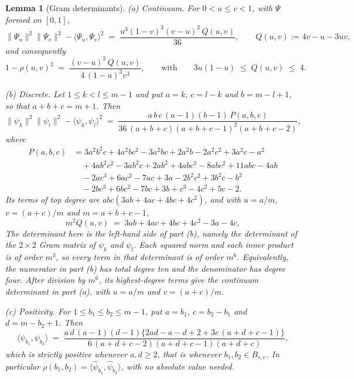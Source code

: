 \documentclass[10pt,a4paper]{amsart}
\newtheorem{lemma}{Lemma}
\begin{document}
\begin{lemma}[Gram determinants]
\label{lem:gramdet}
\emph{(a) Continuum.} For $0 < u \le v < 1$, with $\Psi$ formed on $[0,1]$,
\[
\|\Psi_u\|^2\|\Psi_v\|^2 - \langle \Psi_u,\Psi_v\rangle^2
\;=\; \frac{u^3 (1-v)^3 (v-u)^2 \, Q(u,v)}{36},
\qquad Q(u,v) := 4v - u - 3uv ,
\]
and consequently
\begin{equation}
\label{eq:rhoexact}
1 - \rho(u,v)^2 \;=\; \frac{(v-u)^2\,Q(u,v)}{4\,(1-u)^3 v^3},
\qquad\text{with}\qquad
3u(1-u) \;\le\; Q(u,v) \;\le\; 4 .
\end{equation}

\emph{(b) Discrete.} Let $1 \le k < l \le m-1$ and put $a = k$, $c = l-k$ and
$b = m-l+1$, so that $a+b+c = m+1$. Then
\[
\|\psi_k\|^2\|\psi_l\|^2 - \langle\psi_k,\psi_l\rangle^2
\;=\; \frac{a\,b\,c\,(a-1)(b-1)\,P(a,b,c)}
{36\,(a+b+c)(a+b+c-1)^2(a+b+c-2)} ,
\]
where
\begin{align*}
P(a,b,c) &= 3a^2b^2c + 4a^2bc^2 - 3a^2bc + 2a^2b - 2a^2c^2 + 3a^2c - a^2 \\
&\quad + 4ab^2c^2 - 3ab^2c + 2ab^2 + 4abc^3 - 8abc^2 + 11abc - 4ab \\
&\quad - 2ac^3 + 6ac^2 - 7ac + 3a - 2b^2c^2 + 3b^2c - b^2 \\
&\quad - 2bc^3 + 6bc^2 - 7bc + 3b + c^3 - 4c^2 + 5c - 2 .
\end{align*}
Its terms of top degree are $abc(3ab+4ac+4bc+4c^2)$, and with $u = a/m$, $v = (a+c)/m$ and $m = a+b+c-1$,
\[
m^2 Q(u,v) \;=\; 3ab + 4ac + 4bc + 4c^2 - 3a - 4c ,
\]
The determinant here is the left-hand side of part (b), namely the determinant
of the $2\times2$ Gram matrix of $\psi_k$ and $\psi_l$. Each squared norm and
each inner product is of order $m^3$, so every term in that determinant is of
order $m^6$. Equivalently, the numerator in part (b) has total degree ten and
the denominator has degree four. After division by $m^6$, its highest-degree
terms give the continuum determinant in part (a), with
$u=a/m$ and $v=(a+c)/m$.

\emph{(c) Positivity.} For $1 \le b_1 \le b_2 \le m-1$, put $a = b_1$, $c = b_2-b_1$ and $d = m-b_2+1$. Then
\[
\langle \psi_{b_1}, \psi_{b_2}\rangle \;=\;
\frac{a\,d\,(a-1)(d-1)\big\{ 2ad-a-d+2 + 3c\,(a+d+c-1) \big\}}
{6\,(a+d+c-2)(a+d+c-1)(a+d+c)} ,
\]
which is strictly positive whenever $a, d \ge 2$, that is whenever $b_1, b_2 \in B_{s,e}$. In particular $\rho(b_1,b_2) = \langle\hat\psi_{b_1},\hat\psi_{b_2}\rangle$, with no absolute value needed.
\end{lemma}
\end{document}
